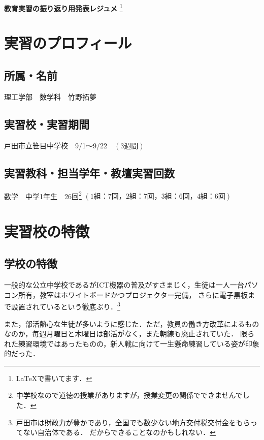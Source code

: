 \documentclass{jlreq}
\begin{document}
\begin{center}
    \LARGE{\textbf{教育実習の振り返り用発表レジュメ}} \footnote{\LaTeX で書いてます．}
\end{center}

\section{実習のプロフィール}
\subsection{所属・名前} 
理工学部　数学科　竹野拓夢

\subsection{実習校・実習期間}
戸田市立笹目中学校　9/1～9/22　$\left( 3週間 \right)$
\subsection{実習教科・担当学年・教壇実習回数}
数学　中学1年生　26回\footnote{中学校なので道徳の授業がありますが，授業変更の関係でできませんでした．} $\left( 1組：7回，2組：7回，3組：6回，4組：6回 \right)$

\section{実習校の特徴}
\subsection{学校の特徴}
一般的な公立中学校であるがICT機器の普及がすさまじく，生徒は一人一台パソコン所有，教室はホワイトボードかつプロジェクター完備，
さらに電子黒板まで設置されているという徹底ぶり．\footnote{戸田市は財政力が豊かであり，全国でも数少ない地方交付税交付金をもらってない自治体である．
だからできることなのかもしれない．}\par
また，部活熱心な生徒が多いように感じた．ただ，教員の働き方改革によるものなのか，毎週月曜日と木曜日は部活がなく，また朝練も廃止されていた．
限られた練習環境ではあったものの，新人戦に向けて一生懸命練習している姿が印象的だった．
\end{document}
